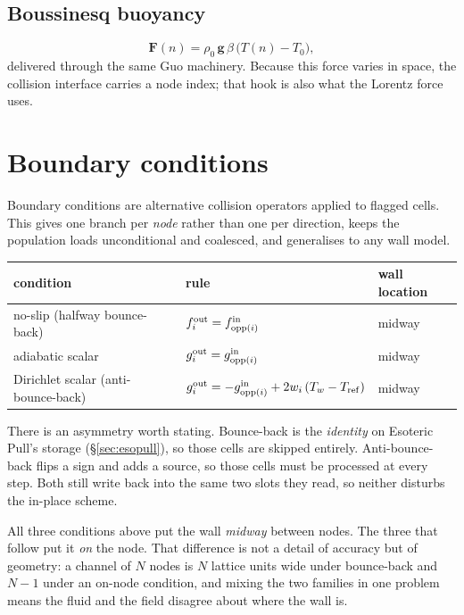 \documentclass[11pt,a4paper]{article}
\begin{document}
\subsection{Boussinesq buoyancy}
\label{sec:boussinesq}

\begin{equation}
  \bm{F}(n) = \rho_0\, \bm{g}\, \beta\,\big(T(n)-T_0\big),
\end{equation}
delivered through the same Guo machinery. Because this force varies in space, the
collision interface carries a node index; that hook is also what the Lorentz force
uses.

\section{Boundary conditions}

Boundary conditions are alternative collision operators applied to flagged cells.
This gives one branch per \emph{node} rather than one per direction, keeps the
population loads unconditional and coalesced, and generalises to any wall model.

\begin{center}\small
\begin{tabular}{lll}
\toprule
condition & rule & wall location \\
\midrule
no-slip (halfway bounce-back) & $f_i^{\rm out} = f_{\mathrm{opp}(i)}^{\rm in}$ & midway \\
adiabatic scalar              & $g_i^{\rm out} = g_{\mathrm{opp}(i)}^{\rm in}$ & midway \\
Dirichlet scalar (anti-bounce-back) &
  $g_i^{\rm out} = -g_{\mathrm{opp}(i)}^{\rm in} + 2w_i\,(T_w - T_{\rm ref})$ & midway \\
\bottomrule
\end{tabular}
\end{center}

\noindent There is an asymmetry worth stating. Bounce-back is the \emph{identity}
on Esoteric Pull's storage (\S\ref{sec:esopull}), so those cells are skipped
entirely. Anti-bounce-back flips a sign and adds a source, so those cells must be
processed at every step. Both still write back into the same two slots they read,
so neither disturbs the in-place scheme.

\medskip
\noindent All three conditions above put the wall \emph{midway} between nodes.
The three that follow put it \emph{on} the node. That difference is not a detail
of accuracy but of geometry: a channel of $N$ nodes is $N$ lattice units wide
under bounce-back and $N-1$ under an on-node condition, and mixing the two
families in one problem means the fluid and the field disagree about where the
wall is.
\end{document}
